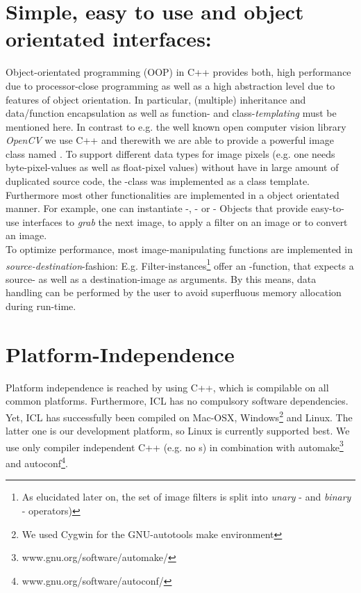 \section{Simple, easy to use and object orientated interfaces:}
Object-orientated programming (OOP) in C++ provides both, high performance due to processor-close programming as well as a high abstraction level due to features of object orientation. In particular, (multiple) inheritance and data/function encapsulation as well as function- and class-\emph{templating} must be mentioned here. In contrast to e.g. the well known open computer vision library \emph{OpenCV} we use C++ and therewith we are able to provide a powerful image class named  . To support different data types for image pixels (e.g. one needs byte-pixel-values as well as float-pixel values) without have in large amount of duplicated source code, the -class was implemented as a class template.\\
Furthermore most other functionalities are implemented in a object orientated manner. For example, one can instantiate   -,  - or  - Objects that provide easy-to-use interfaces to \emph{grab} the next image, to apply a filter on an image or to convert an image.\\
To optimize performance, most image-manipulating functions are implemented in \emph{source-destination}-fashion: E.g. Filter-instances\footnote{As elucidated later on, the set of image filters is split into \emph{unary} - and \emph{binary} - operators)} offer an -function, that expects a source- as well as a destination-image as arguments. By this means, data handling can be performed by the user to avoid superfluous memory allocation during run-time. 


\section{Platform-Independence}
Platform independence is reached by using C++, which is compilable on all common platforms. Furthermore, ICL has no compulsory software dependencies. Yet, ICL has successfully been compiled on Mac-OSX, Windows\footnote{We used Cygwin for the GNU-autotools make environment} and Linux. The latter one is our development platform, so Linux is currently supported best. We use only compiler independent C++ (e.g. no s) in combination with automake\footnote{www.gnu.org/software/automake/} and autoconf\footnote{www.gnu.org/software/autoconf/}.  

